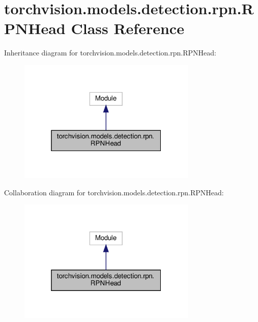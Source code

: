 \hypertarget{classtorchvision_1_1models_1_1detection_1_1rpn_1_1RPNHead}{}\section{torchvision.\+models.\+detection.\+rpn.\+R\+P\+N\+Head Class Reference}
\label{classtorchvision_1_1models_1_1detection_1_1rpn_1_1RPNHead}


Inheritance diagram for torchvision.\+models.\+detection.\+rpn.\+R\+P\+N\+Head\+:
\nopagebreak
\begin{figure}[H]
\begin{center}
\leavevmode
\includegraphics[width=241pt]{classtorchvision_1_1models_1_1detection_1_1rpn_1_1RPNHead__inherit__graph}
\end{center}
\end{figure}


Collaboration diagram for torchvision.\+models.\+detection.\+rpn.\+R\+P\+N\+Head\+:
\nopagebreak
\begin{figure}[H]
\begin{center}
\leavevmode
\includegraphics[width=241pt]{classtorchvision_1_1models_1_1detection_1_1rpn_1_1RPNHead__coll__graph}
\end{center}
\end{figure}
